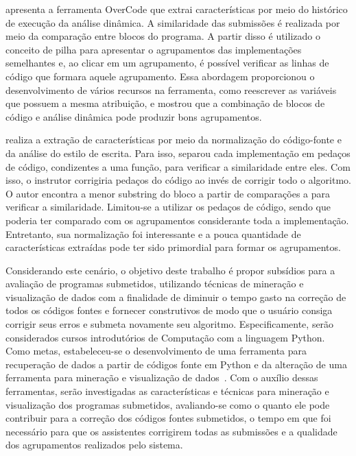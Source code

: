 	 apresenta a ferramenta OverCode que extrai características
	por meio do histórico de execução da análise dinâmica. A similaridade das submissões
	é realizada por meio da comparação entre blocos do programa. A partir disso é utilizado
	o conceito de pilha para apresentar o agrupamentos das implementações semelhantes e,
	ao clicar em um agrupamento, é possível verificar as linhas de código que formara
	aquele agrupamento. Essa abordagem proporcionou o desenvolvimento de vários recursos
	na ferramenta, como reescrever as variáveis que possuem a mesma atribuição, e mostrou
	que a combinação de blocos de código e análise dinâmica pode produzir bons agrupamentos.
	
	 realiza a extração de características por meio da normalização
	do código-fonte e da análise do estilo de escrita. Para isso, separou cada implementação
	em pedaços de código, condizentes a uma função, para verificar a similaridade entre eles.
	Com isso, o instrutor corrigiria pedaços do código ao invés de corrigir todo o algoritmo.
	O autor encontra a menor substring do bloco a partir de comparações  a
	 para verificar a similaridade. Limitou-se a utilizar os pedaços de
	código, sendo que poderia ter comparado com os agrupamentos considerante toda a
	implementação. Entretanto, sua normalização foi interessante e a pouca quantidade de
	características extraídas pode ter sido primordial para formar os agrupamentos.
	
	
	Considerando este cenário, o objetivo deste trabalho é propor subsídios para a
	avaliação de programas submetidos, utilizando técnicas de mineração e visualização
	de dados com a finalidade de diminuir o tempo gasto na correção de todos os códigos
	fontes e  fornecer  construtivos de modo que o usuário consiga
	corrigir seus erros e submeta novamente seu algoritmo. Especificamente, serão
	considerados cursos introdutórios de Computação com a linguagem Python. Como
	metas, estabeleceu-se o desenvolvimento de uma ferramenta para recuperação de
	dados a partir de códigos fonte em Python e da alteração de uma ferramenta para
	mineração e visualização de dados~\cite{Alencar}. Com o auxílio dessas ferramentas,
	serão investigadas as características e técnicas para mineração e visualização
	dos programas submetidos, avaliando-se como o quanto ele pode contribuir para
	a correção dos códigos fontes submetidos, o tempo em que foi necessário para
	que os assistentes corrigirem todas as submissões e a qualidade dos agrupamentos
	realizados pelo sistema.
	
